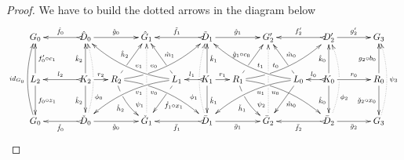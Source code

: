 \documentclass[a4paper,UKenglish,cleveref,pdftex,thm-restate,numberwithinsect]{lipics-v2021}
\newcommand{\id}[1]{\mathsf{id}_{#1}}
\def\G{\textbf {\textup{G}}}
\begin{document}
\begin{proof}
	We have to build the dotted arrows in the diagram below
	\[\xymatrix@C=15pt@R=30pt{G_0 && \ar@{>->}[ll]_{\hat{f}_0} \hat{D}_0 \ar[rr]^{\hat{g}_0}&& \hat{G}_1  && \ar@{>->}[ll]_{\tilde{f}_1} \tilde{D}_1 \ar[rr]^{\tilde{g}_1}&& G'_2 && \ar@{>->}[ll]_{f'_2} D'_2 \ar[rr]^{g'_2}&& G_3 \\
		L_2\ar[d]^{f_0\circ z_1} \ar[u]_{f'_0\circ c_1}&& K_2 \ar[u]^{\hat{k}_2}\ar[d]_{\mathring{k}_2}\ar@{>->}[ll]_{l_2} \ar[r]^{r_2} & R_2 \ar@/_.35cm/[urrr]^(.4){e_0}|(.29)\hole \ar[ur]|(.28)\hole^{\hat{h}_2} \ar@/^.35cm/[drrr]_(.4){v_0}|(.29)\hole \ar@/_.2cm/[dr]|(.28)\hole_{\mathring{h}_2} && L_1 \ar@/^.35cm/[ulll]_(.4){e_1} \ar[ul]|(.28)\hole_{\hat{m}_1} \ar@/_.35cm/[dlll]^(.4){v_1} \ar[dl]|(.28)\hole^{\mathring{f}_1 \circ x_1}& K_1  \ar[u]_{\hat{k}_1}\ar[d]^{\mathring{k}_1}\ar@{>->}[l]_{l_1} \ar[r]^{r_1} & R_1 \ar@/^.35cm/[drrr]_(.4){u_0}|(.29)\hole\ar@/_.2cm/[dr]_{\check{h}_1}|(.28)\hole \ar@/_.35cm/[urrr]^(.4){t_0}|(.29)\hole \ar[ur]|(.28)\hole^{\hat{g}_1\circ c_0}  && L_0\ar[ul]|(.28)\hole_{\hat{m}_0} \ar@/^.35cm/[ulll]_(.4){t_1} \ar@/_.35cm/[dlll]^(.4){u_1} \ar[dl]^{\mathring{m}_0}& K_0 \ar[d]_{\mathring{k}_0}\ar[u]^{\hat{k}_0}\ar@{>->}[l]_{l_0} \ar[rr]^{r_0} && R_0 \ar[u]^{g_2\circ b_0}\ar[d]_{\check{g}_2\circ x_0} \\G_0 \ar@/^.3cm/[uu]^{\id{G_0}}&& \ar@{>->}[ll]^{\check{f}_0} \check{D}_0 \ar@{.>}@/_.3cm/[uu]_(.3){\phi_{0}}|\hole  \ar[rr]_{\check{g}_0}&& \check{G}_1  \ar@{.>}@/_.0cm/[uu]^(.2){\psi_{1}}|(.43)\hole |(.57)\hole  && \ar@{>->}[ll]^{\bar{f}_1} \bar{D}_1 \ar@{.>}@/^.3cm/[uu]^(.3){\phi_{1}}|\hole \ar[rr]_{\bar{g}_1}&& \bar{G}_2 \ar@{.>}@/_.0cm/[uu]^(.2){\psi_{2}}|(.43)\hole |(.57)\hole && \ar@{>->}[ll]^{\bar{f}_2} \ar@{.>}@/_.4cm/[uu]_(.3){\phi_{2}}|\hole \bar{D}_2 \ar[rr]_{\bar{g}_2}&& G_3 \ar@{.>}@/_.3cm/[uu]_{\psi_{3}} }\]
	

\end{proof}
\end{document}
